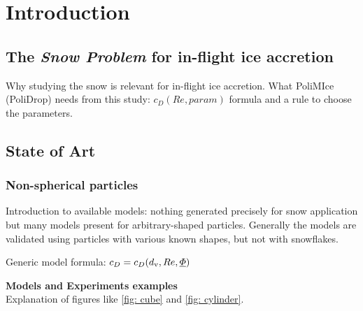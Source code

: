 \documentclass[a4paper,12pt,twoside,titlepage,openright]{book}
\newcommand{\dv}{d_{\textup{v}}}
\begin{document}
	
\frontmatter

\cleardoublepage
%
\cleardoublepage
\tableofcontents
		
\cleardoublepage

\mainmatter
%
%
%

\chapter{Introduction}
\label{ch: intro}

	\section{The \textit{Snow Problem} for in-flight ice accretion}
	\label{sec: SnowProblem}
		Why studying the snow is relevant for in-flight ice accretion. What PoliMIce (PoliDrop) needs from this study: $ c_D(Re, param) $ formula and a rule to choose the parameters.
	
	\section{State of Art}	
	\subsection{Non-spherical particles}
	\label{sec: NonSphericalParticles}
		Introduction to available models: nothing generated precisely for snow application but many models present for arbitrary-shaped particles. Generally the models are validated using particles with various known shapes, but not with snowflakes.
	
		Generic model formula: $ c_D = c_D(\dv, Re, \underline{\varPhi}) $
			
		\textbf{Models and Experiments examples}\\
		Explanation of figures like \ref{fig: cube} and \ref{fig: cylinder}.
		
\end{document}
